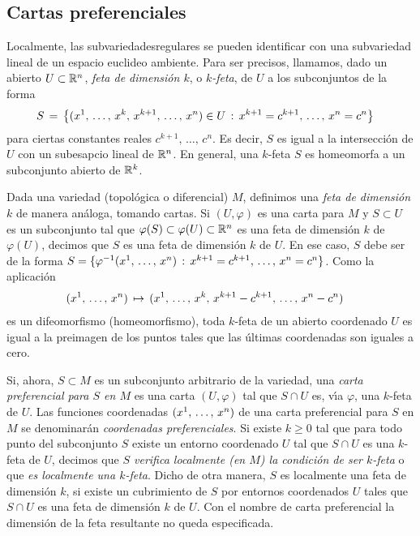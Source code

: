 \subsection{Cartas preferenciales}
Localmente, las subvariedadesregulares se pueden identificar con una
subvariedad lineal de un espacio euclideo ambiente. Para ser precisos,
llamamos, dado un abierto $U\subset\mathbb{R}^{n}$, \emph{feta de dimensi\'{o}n %
$k$}, o \emph{$k$-feta}, de $U$ a los subconjuntos de la forma
\begin{align*}
	S & \,=\,\left\lbrace (\lista*{x}{k},\,x^{k+1},\,\dots,\,x^{n})\in U
		\,:\, x^{k+1}=c^{k+1},\,\dots,\,x^{n}=c^{n}\right\rbrace
\end{align*}
%
para ciertas constantes reales $c^{k+1},\,\dots,\,c^{n}$. Es decir,
$S$ es igual a la intersecci\'{o}n de $U$ con un subesapcio lineal de
$\mathbb{R}^{n}$. En general, una $k$-feta $S$ es homeomorfa a un subconjunto
abierto de $\mathbb{R}^{k}$.

Dada una variedad (topol\'{o}gica o diferencial) $M$, definimos una
\emph{feta de dimensi\'{o}n $k$} de manera an\'{a}loga, tomando cartas.
Si $(U,\varphi)$ es una carta para $M$ y $S\subset U$ es un subconjunto
tal que $\varphi(S)\subset\varphi(U)\subset\mathbb{R}^{n}$ es una feta de
dimensi\'{o}n $k$ de $\varphi(U)$, decimos que $S$ es una feta de
dimensi\'{o}n $k$ de $U$. En ese caso, $S$ debe ser de la forma
$S=\{\varphi^{-1}(\lista*{x}{n})\,:\, x^{k+1}=c^{k+1},\,\dots,\,x^{n}=c^{n}\}$.
Como la aplicaci\'{o}n
\begin{align*}
	(\lista*{x}{n}) & \,\mapsto\, (\lista*{x}{k},\,x^{k+1}-c^{k+1},\,
		\dots,\,x^{n}-c^{n})
\end{align*}
%
es un difeomorfismo (homeomorfismo), toda $k$-feta de un abierto coordenado
$U$ es igual a la preimagen de los puntos tales que las \'{u}ltimas
coordenadas son iguales a cero.

Si, ahora, $S\subset M$ es un subconjunto arbitrario de la variedad, una
\emph{carta preferencial para $S$ en $M$} es una carta $(U,\varphi)$
tal que $S\cap U$ es, v\'{\i}a $\varphi$, una $k$-feta de $U$. Las
funciones coordenadas $(\lista*{x}{n})$ de una carta preferencial
para $S$ en $M$ se denominar\'{a}n \emph{coordenadas preferenciales}.
Si existe $k\geq 0$ tal que para todo punto del subconjunto $S$ existe un
entorno coordenado $U$ tal que $S\cap U$ es una $k$-feta de $U$, decimos que
\emph{$S$ verifica localmente (en $M$) la condici\'{o}n de ser $k$-feta} o
que \emph{es localmente una $k$-feta}. Dicho de otra manera, $S$ es localmente
una feta de dimensi\'{o}n $k$, si existe un cubrimiento de $S$ por entornos
coordenados $U$ tales que $S\cap U$ es una feta de dimensi\'{o}n $k$
de $U$. Con el nombre de carta preferencial la dimensi\'{o}n de la feta
resultante no queda especificada.

